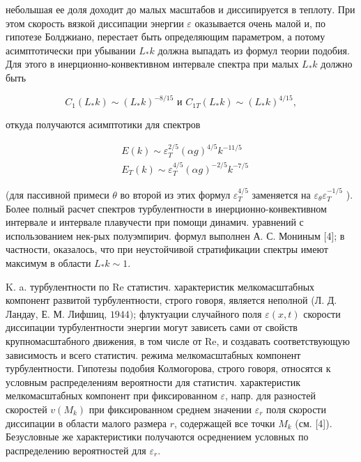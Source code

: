 \documentclass[10pt]{article}
\begin{document}
неболышая ее доля доходит до малых масштабов и диссипируется в теплоту. При этом скорость вязкой диссипации энергии $\varepsilon$ оказывается очень малой и, по гипотезе Болджиано, перестает быть определяющим параметром, а потому асимптотически при убывании $L_{*} k$ должна выпадать из формул теории подобия. Для этого в инерционно-конвективном интервале спектра при малых $L_{*} k$ должно быть



\[

C_{1}\left(L_{*} k\right) \sim\left(L_{*} k\right)^{-8 / 15} \text { и } C_{1 T}\left(L_{*} k\right) \sim\left(L_{*} k\right)^{4 / 15},

\]



откуда получаются асимптотики для спектров



\[

\begin{aligned}

& E(k) \sim \varepsilon_{T}^{2 / 5}(\alpha g)^{4 / 5} k^{-11 / 5} \\

& E_{T}(k) \sim \varepsilon_{T}^{4 / 5}(\alpha g)^{-2 / 5} k^{-7 / 5}

\end{aligned}

\]



(для пассивной примеси $\theta$ во второй из этих формул $\varepsilon_{T}^{4 / 5}$ заменяется на $\varepsilon_{\theta} \varepsilon_{T}^{-1 / 5}$ ). Более полный расчет спектров турбулентности в инерционно-конвективном интервале и интервале плавучести при помощи динамич. уравнений с использованием нек-рых полуэмпирич. формул выполнен А. С. Мониным [4]; в частности, оказалось, что при неустойчивой стратификации спектры имеют максимум в области $L_{*} k \sim 1$.



K. a. турбулентности по Re статистич. характеристик мелкомасштабных компонент развитой турбулентности, строго говоря, является неполной (Л. Д. Ландау, Е. М. Лифшиц, $1944)$; флуктуации случайного поля $\varepsilon(x, t)$ скорости диссипации турбулентности энергии могут зависеть сами от свойств крупномасштабного движения, в том числе от Re, и создавать соответствующую зависимость и всего статистич. режима мелкомасштабных компонент турбулентности. Гипотезы подобия Колмогорова, строго говоря, относятся к условным распределениям вероятности для статистич. характеристик мелкомасштабных компонент при фиксированном $\varepsilon$, напр. для разностей скоростей $v\left(M_{k}\right)$ при фиксированном среднем значении $\varepsilon_{r}$ поля скорости диссипации в области малого размера $r$, содержащей все точки $M_{k}$ (см. [4]). Безусловные же характеристики получаются осреднением условных по распределению вероятностей для $\varepsilon_{r}$.
\end{document}
